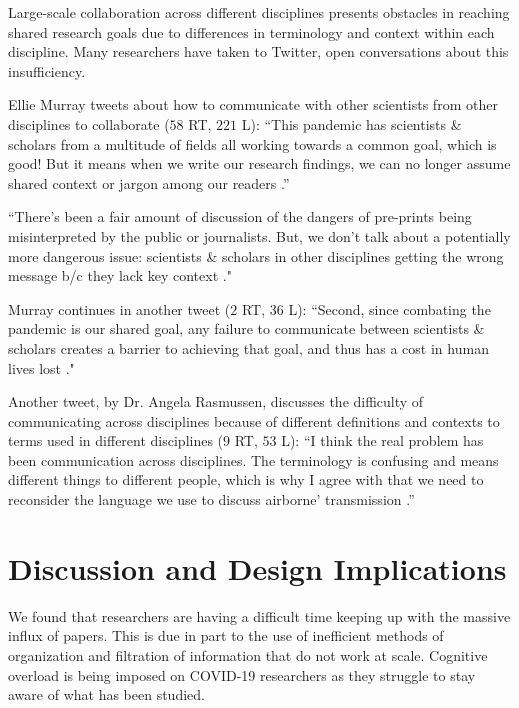 \documentclass[acmsmall,authordraft]{acmart}
\begin{document}
Large-scale collaboration across different disciplines presents obstacles in reaching shared research goals due to differences in terminology and context within each discipline. Many researchers have taken to Twitter, open conversations about this insufficiency.

Ellie Murray tweets about how to communicate with other scientists from other disciplines to collaborate ($58$ RT, $221$ L): 
``This pandemic has scientists \& scholars from a multitude of fields all working towards a common goal, which is good! But it means when we write our research findings, we can no longer assume shared context or jargon among our readers \citep{Murray2020twitter}.'' 

``There's been a fair amount of discussion of the dangers of pre-prints being misinterpreted by the public or journalists. But, we don't talk about a potentially more dangerous issue: scientists \& scholars in other disciplines getting the wrong message b/c they lack key context \citep{Murray2020jargon}."

Murray continues in another tweet ($2$ RT, $36$ L): 
``Second, since combating the pandemic is our shared goal, any failure to communicate between scientists \& scholars creates a barrier to achieving that goal, and thus has a cost in human lives lost \citep{Murray2020pandemic}." 

Another tweet, by Dr. Angela Rasmussen, discusses the difficulty of communicating across disciplines because of different definitions and contexts to terms used in different disciplines ($9$ RT, $53$ L): 
``I think the real problem has been communication across disciplines. The terminology is confusing and means different things to different people, which is why I agree with \@SaskiaPopescu that we need to reconsider the language we use to discuss airborne' transmission \citep{Rasmussen2020twitter}.''


\section{Discussion and Design Implications}
\label{Discussion_and_Design_Implications}

We found that researchers are having a difficult time keeping up with the massive influx of papers. This is due in part to the use of inefficient methods of organization and filtration of information that do not work at scale. Cognitive overload is being imposed on COVID-19 researchers as they struggle to stay aware of what has been studied.
\end{document}
